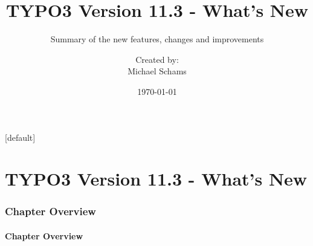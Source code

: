 \documentclass[t]{beamer}
\title{TYPO3 Version 11.3 - What's New}
\subtitle{Summary of the new features, changes and improvements}
\author{
	\centerline{Created by:}
	\centerline{Michael Schams}
}
\date{\today}
\begin{document}
\sharefont


\begingroup
	[default]
	\begin{frame}
		\titlepage
	\end{frame}
\endgroup


\section*{TYPO3 Version 11.3 - What's New}
\begin{frame}[fragile]
	\frametitle{Chapter Overview}
	\framesubtitle{Chapter Overview}

	\tableofcontents

\end{frame}





















\end{document}
